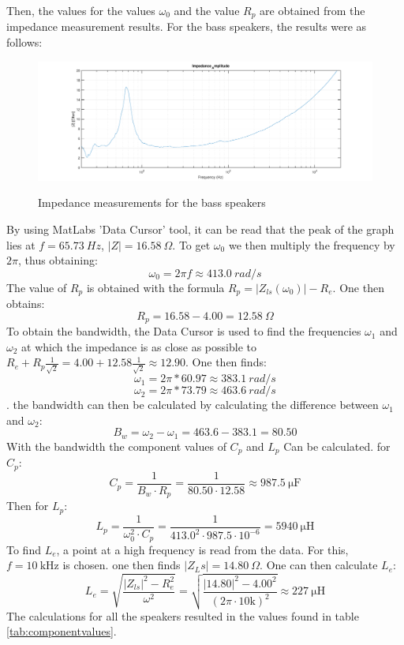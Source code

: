 \documentclass{article}
\newcommand\abs[1]{\left|#1\right|}
\begin{document}
Then, the values for the values $\omega_0$ and the value $R_p$ are obtained from the impedance measurement results. For the bass speakers, the results were as follows:

\begin{figure}[ht]
  \centering
  \includegraphics[height=0.2\paperheight]{Figures/Bass_Impedance_Measurements}%
  \label{fig:Bass_Impedance_Measurements}
  \caption{Impedance measurements for the bass speakers}
\end{figure}

By using MatLabs 'Data Cursor' tool, it can be read that the peak of the graph lies at $f = 65.73 \ Hz$, $\abs{Z} = 16.58 \ \Omega$. To get $\omega_0$ we then multiply the frequency by $2\pi$, thus obtaining:
\newline
$$\omega_0 = 2\pi f \approx 413.0 \ rad/s$$
\newline
The value of $R_p$ is obtained with the formula $R_p = \abs{Z_{ls}(\omega_0)} - R_e$. One then obtains: 
\newline
$$R_p = 16.58 - 4.00 = 12.58\ \Omega$$
\newline
To obtain the bandwidth, the Data Cursor is used to find the frequencies $\omega_1$ and $\omega_2$ at which the impedance is as close as possible to $R_e + R_p \frac{1}{\sqrt{2}} = 4.00 + 12.58 \frac{1}{\sqrt{2}} \approx 12.90$. One then finds:
\newline
$$\omega_1 = 2\pi * 60.97 \approx 383.1\ rad/s$$
$$\omega_2 = 2\pi * 73.79 \approx 463.6\ rad/s$$. 
\newline
the bandwidth can then be calculated by calculating the difference between $\omega_1$ and $\omega_2$: 
\newline
$$B_w = \omega_2 - \omega_1 = 463.6 - 383.1 = 80.50 $$
\newline 
With the bandwidth the component values of $C_p$ and $L_p$ Can be calculated. for $C_p$:
\newline
  $$C_p = \frac{1}{B_w \cdot R_p} = \frac{1}{80.50 \cdot 12.58} \approx 987.5\ \si{\micro\farad}$$
\newline
Then for $L_p$:
\newline
  $$L_p = \frac{1}{\omega_0^2 \cdot C_p} = \frac{1}{413.0^2 \cdot 987.5\cdot10^{-6}} = 5940\ \si{\micro\henry}$$
\newline
To find $L_e$, a point at a high frequency is read from the data. For this, $f = 10\ \si{\kilo\hertz}$ is chosen. one then finds $\abs{Z_Ls} = 14.80\ \Omega$. One can then calculate $L_e$:
$$L_e = \sqrt{\frac{\abs{Z_{ls}}^2 - R_e^2}{\omega^2}} = \sqrt{\frac{\abs{14.80}^2 - 4.00^2}{(2\pi\cdot10\si{\kilo})^2}} \approx 227\ \si{\micro\henry}$$
\newline
The calculations for all the speakers resulted in the values found in table \ref{tab:componentvalues}.
\end{document}
